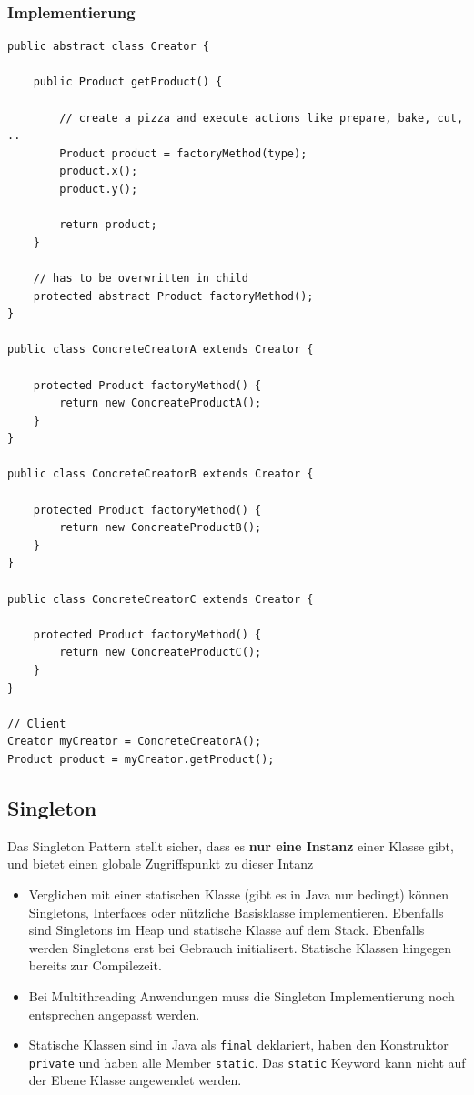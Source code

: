 \subsubsection{Implementierung}
\begin{lstlisting}
public abstract class Creator {
	
	public Product getProduct() {
		
		// create a pizza and execute actions like prepare, bake, cut, ..
		Product product = factoryMethod(type);
		product.x();
		product.y();
		
		return product;
	}
	
	// has to be overwritten in child
	protected abstract Product factoryMethod();
}

public class ConcreteCreatorA extends Creator {
	
	protected Product factoryMethod() {
		return new ConcreateProductA();	
	}
}

public class ConcreteCreatorB extends Creator {

	protected Product factoryMethod() {
		return new ConcreateProductB();	
	}
}

public class ConcreteCreatorC extends Creator {

	protected Product factoryMethod() {
		return new ConcreateProductC();	
	}
}

// Client
Creator myCreator = ConcreteCreatorA();
Product product = myCreator.getProduct();
\end{lstlisting}

\clearpage

\subsection{Singleton}
\label{sec:singleton}
Das Singleton Pattern stellt sicher, dass es \textbf{nur eine Instanz} einer Klasse gibt, und bietet einen globale Zugriffspunkt zu dieser Intanz
\begin{itemize}
	\item Verglichen mit einer statischen Klasse (gibt es in Java nur bedingt) können Singletons, Interfaces oder nützliche Basisklasse implementieren. Ebenfalls sind Singletons im Heap und statische Klasse auf dem Stack. Ebenfalls werden Singletons erst bei Gebrauch initialisert. Statische Klassen hingegen bereits zur Compilezeit.
	\item Bei Multithreading Anwendungen muss die Singleton Implementierung noch entsprechen angepasst werden.
	\item Statische Klassen sind in Java als \lstinline|final| deklariert, haben den Konstruktor \lstinline|private| und haben alle Member \lstinline|static|. Das \lstinline|static| Keyword kann nicht auf der Ebene Klasse angewendet werden.
\end{itemize}

